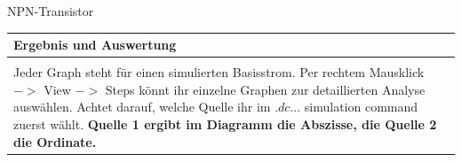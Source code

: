 \begin{frame}[t]{NPN-Transistor}
    \begin{spacing}{0.9} \begin{tiny}
      \begin{table}[h!]
        \begin{tabular}{p{10cm} }
          \hline
          \textbf{Ergebnis und Auswertung} \\
          \hline \\    
          Jeder Graph steht für einen simulierten Basisstrom. Per rechtem Mausklick $->$ View $->$ Steps könnt ihr einzelne Graphen zur
          detaillierten Analyse auswählen. \newline\newline Achtet darauf, welche Quelle ihr im $.dc ...$ simulation command zuerst wählt. \textbf{Quelle 1 ergibt im Diagramm die Abszisse, die Quelle 2 die Ordinate.}
        \end{tabular}
      \end{table}
    \end{tiny} \end{spacing}
    
     \end{frame}

